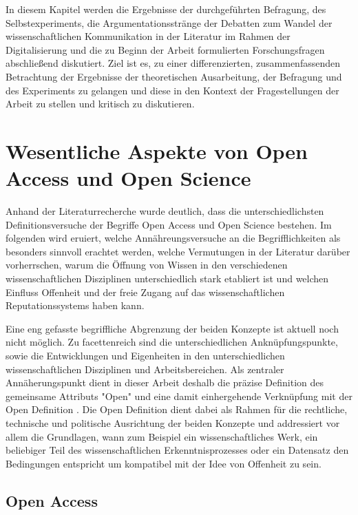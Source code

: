 In diesem Kapitel werden die Ergebnisse der durchgeführten Befragung, des Selbstexperiments, die Argumentationsstränge der Debatten zum Wandel der wissenschaftlichen Kommunikation in der Literatur im Rahmen der Digitalisierung und die zu Beginn der Arbeit formulierten Forschungsfragen abschließend diskutiert. Ziel ist es, zu einer differenzierten, zusammenfassenden Betrachtung der Ergebnisse der theoretischen Ausarbeitung, der Befragung und des Experiments zu gelangen und diese in den Kontext der Fragestellungen der Arbeit zu stellen und kritisch zu diskutieren.

\section{Wesentliche Aspekte von Open Access und Open Science}

Anhand der Literaturrecherche wurde deutlich, dass die unterschiedlichsten Definitionsversuche der Begriffe Open Access und Open Science bestehen. Im folgenden wird eruiert, welche Annähreungsversuche an die Begrifflichkeiten als besonders sinnvoll erachtet werden, welche Vermutungen in der Literatur darüber vorherrschen, warum die Öffnung von Wissen in den verschiedenen wissenschaftlichen Disziplinen unterschiedlich stark etabliert ist und welchen Einfluss Offenheit und der freie Zugang auf das wissenschaftlichen Reputationssystems haben kann.

Eine eng gefasste begriffliche Abgrenzung der beiden Konzepte ist aktuell noch nicht möglich. Zu facettenreich sind die unterschiedlichen Anknüpfungspunkte, sowie die Entwicklungen und Eigenheiten in den unterschiedlichen wissenschaftlichen Disziplinen und Arbeitsbereichen. Als zentraler Annäherungspunkt dient in dieser Arbeit deshalb die präzise Definition des gemeinsame Attributs "Open" und eine damit einhergehende Verknüpfung mit der Open Definition \cite{open_definition}. Die Open Definition dient dabei als Rahmen für die rechtliche, technische und politische Ausrichtung der beiden Konzepte und addressiert vor allem die Grundlagen, wann zum Beispiel ein wissenschaftliches Werk, ein beliebiger Teil des wissenschaftlichen Erkenntnisprozesses oder ein Datensatz den Bedingungen entspricht um kompatibel mit der Idee von Offenheit zu sein.

\subsection{Open Access}

